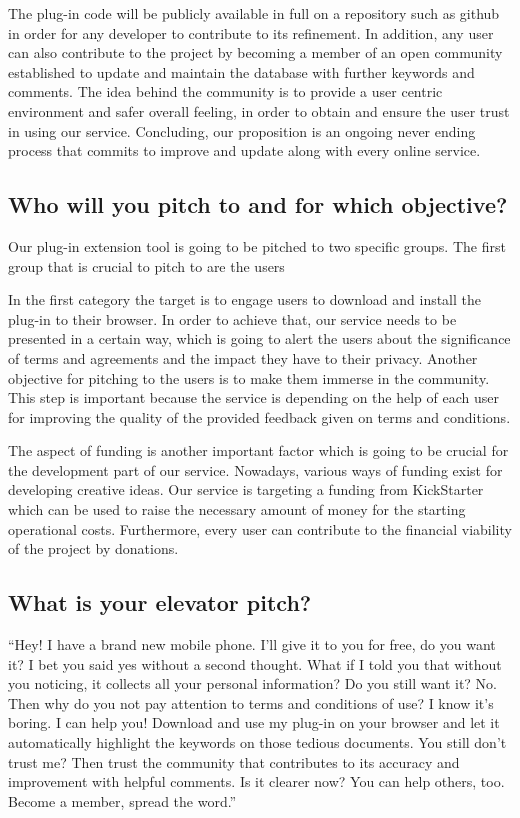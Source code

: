 The plug-in code will be publicly available in full on a repository such as 
github in order for any developer to contribute to its refinement. In addition, 
any user can also contribute to the project by becoming a member of an open 
community established to update and maintain the database with further keywords 
and comments. The idea behind the community is to provide a user centric 
environment and safer overall feeling, in order to obtain and ensure the user 
trust in using our service. Concluding, our proposition is an ongoing never 
ending process that commits to improve and update along with every online 
service. 

\subsection{Who will you pitch to and for which objective?}

Our plug-in extension tool is going to be pitched to two specific groups. The 
first group that is crucial to  pitch to are the users  

In the first category the target is to engage users to download and install the 
plug-in to their browser. In order to achieve that, our service needs to be 
presented in a certain way, which is going to alert the users about the 
significance of terms and agreements and the impact they have to their privacy. 
Another objective for pitching to the users is to make them immerse in the 
community. This step is important because the service is depending on the help 
of each user for improving the quality of the provided feedback given on terms 
and conditions.

The aspect of funding is another important factor which is going to be crucial 
for the development part of our service. Nowadays, various ways of funding exist 
for developing creative ideas. Our service is targeting a funding from 
KickStarter which can be used to raise the necessary amount of money for the 
starting operational costs. Furthermore, every user can contribute to the 
financial viability of the project by donations. 

\subsection{What is your elevator pitch?}

``Hey! I have a brand new mobile phone. I’ll give it to you for free, do you 
want it? I bet you said yes without a second thought. What if I told you that 
without you noticing, it collects all your personal information? Do you still 
want it? No. Then why do you not pay attention to terms and conditions of use? I 
know it's boring. I can help you! Download and use my plug-in on your browser 
and let it automatically highlight the keywords on those tedious documents. You 
still don't trust me? Then trust the community that contributes to its accuracy 
and improvement with helpful comments. Is it clearer now? You can help others, 
too. Become a member, spread the word.''
